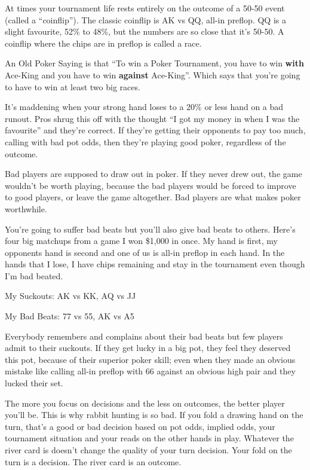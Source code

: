 At times your tournament life rests entirely on the outcome of
a 50-50 event (called a ``coinflip'').
The classic coinflip is AK vs QQ, all-in preflop. QQ is a slight
favourite, 52\% to 48\%, but the numbers are so close that it's 50-50.
A coinflip where the chips are in preflop is called a race.

An Old Poker Saying is that ``To win a
Poker Tournament, you have to win \textbf{with} Ace-King and
you have to win \textbf{against} Ace-King''. Which says that you're
going to have to win at least two big races.

It's maddening when your strong hand loses to a 20\% or less
hand on a bad runout. Pros shrug this off with
the thought ``I got my money in when I was the favourite'' and they're
correct. If they're getting their opponents to pay too much, calling
with bad pot odds, then they're playing good poker, regardless of
the outcome.

Bad players are supposed to draw out in poker. If they never drew
out, the game wouldn't be worth playing, because the bad players
would be forced to improve to good players, or leave the game
altogether. Bad players are what makes poker worthwhile.

You're going to suffer bad beats but you'll also give bad beats
to others. Here's four big matchups from a game
I won \$1,000 in once. My hand is first, my opponents hand is second
and one of us is all-in preflop in each hand. In the hands that I
lose, I have chips remaining and stay in the tournament even
though I'm bad beated.

My Suckouts: AK vs KK, AQ vs JJ

My Bad Beats: 77 vs 55, AK vs A5

Everybody remembers and complains about their bad beats but few
players admit to their suckouts. If they get lucky in a big pot, they
feel they deserved this pot, because of their superior poker skill;
even when they made an obvious mistake like calling all-in preflop
with 66 against an obvious high pair and they lucked their set.


The more you focus on decisions and the less on outcomes, the
better player you'll be. This is why rabbit hunting is so bad. If
you fold a drawing hand on the turn, that's a good or bad decision
based on pot odds, implied odds, your tournament situation
and your reads on the other hands in play. Whatever the river card is
doesn't change the quality of your turn decision. Your fold on the
turn is a decision. The river card is an outcome.

